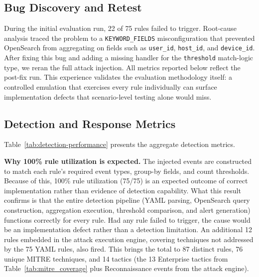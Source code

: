 \documentclass[conference,10pt]{IEEEtran}
\begin{document}
\subsection{Bug Discovery and Retest}

During the initial evaluation run, 22 of 75 rules failed to trigger. Root-cause analysis traced the problem to a \texttt{KEYWORD\_FIELDS} misconfiguration that prevented OpenSearch from aggregating on fields such as \texttt{user\_id}, \texttt{host\_id}, and \texttt{device\_id}. After fixing this bug and adding a missing handler for the \texttt{threshold} match-logic type, we reran the full attack injection. All metrics reported below reflect the post-fix run. This experience validates the evaluation methodology itself: a controlled emulation that exercises every rule individually can surface implementation defects that scenario-level testing alone would miss.

\subsection{Detection and Response Metrics}

Table~\ref{tab:detection-performance} presents the aggregate detection metrics.

\textbf{Why 100\% rule utilization is expected.} The injected events are constructed to match each rule's required event types, group-by fields, and count thresholds. Because of this, 100\% rule utilization (75/75) is an expected outcome of correct implementation rather than evidence of detection capability. What this result confirms is that the entire detection pipeline (YAML parsing, OpenSearch query construction, aggregation execution, threshold comparison, and alert generation) functions correctly for every rule. Had any rule failed to trigger, the cause would be an implementation defect rather than a detection limitation. An additional 12 rules embedded in the attack execution engine, covering techniques not addressed by the 75 YAML rules, also fired. This brings the total to 87 distinct rules, 76 unique MITRE techniques, and 14 tactics (the 13 Enterprise tactics from Table~\ref{tab:mitre_coverage} plus Reconnaissance events from the attack engine).
\end{document}
